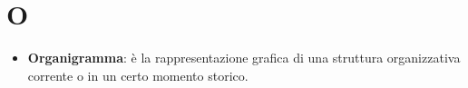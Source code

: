 \section{O}
\begin{itemize}
	\item 
	\textbf{Organigramma}: è la rappresentazione grafica di una struttura organizzativa corrente o in un certo momento storico.
\end{itemize}